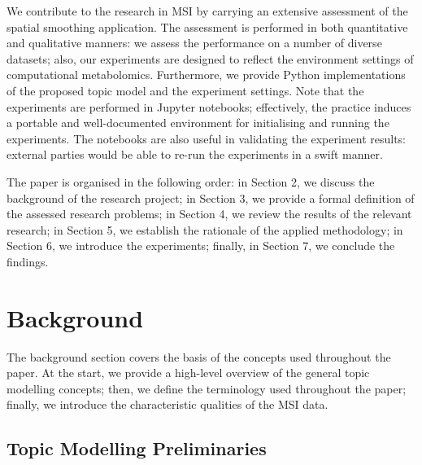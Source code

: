 \documentclass{mpaper}
\begin{document}
\par We contribute to the research in MSI by carrying an extensive assessment of the spatial smoothing application. The assessment is performed in both quantitative and qualitative manners: we assess the performance on a number of diverse datasets; also, our experiments are designed to reflect the environment settings of computational metabolomics. Furthermore, we provide Python implementations of the proposed topic model and the experiment settings. Note that the experiments are performed in Jupyter notebooks; effectively, the practice induces a portable and well-documented environment for initialising and running the experiments. The notebooks are also useful in validating the experiment results: external parties would be able to re-run the experiments in a swift manner.

\par The paper is organised in the following order: in Section 2, we discuss the background of the research project; in Section 3, we provide a formal definition of the assessed research problems; in Section 4, we review the results of the relevant research; in Section 5, we establish the rationale of the applied methodology; in Section 6, we introduce the experiments; finally, in Section 7, we conclude the findings. 

\section{Background}

\par The background section covers the basis of the concepts used throughout the paper. At the start, we provide a high-level overview of the general topic modelling concepts; then, we define the terminology used throughout the paper; finally, we introduce the characteristic qualities of the MSI data.  
\subsection{Topic Modelling Preliminaries}
\end{document}
